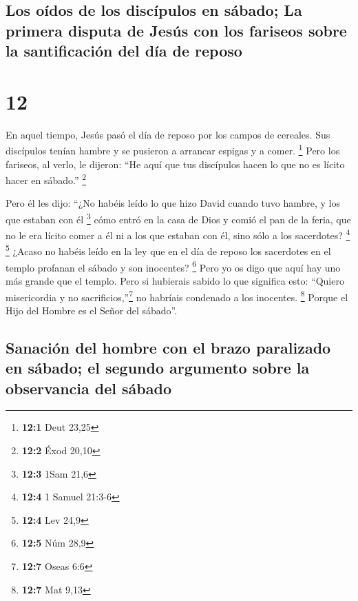 \begin{paracol}{2}
{\subsection{Los oídos de los discípulos en sábado; La primera disputa de
Jesús con los fariseos sobre la santificación del día de
reposo}\label{los-ouxeddos-de-los-discuxedpulos-en-suxe1bado-la-primera-disputa-de-jesuxfas-con-los-fariseos-sobre-la-santificaciuxf3n-del-duxeda-de-reposo}}

\hypertarget{section-22}{%
\section{12}\label{section-22}}

 En aquel tiempo, Jesús pasó el día de reposo por los
campos de cereales. Sus discípulos tenían hambre y se pusieron a
arrancar espigas y a comer. \footnote{\textbf{12:1} Deut 23,25}
 Pero los fariseos, al verlo, le dijeron: ``He aquí que
tus discípulos hacen lo que no es lícito hacer en sábado.'' \footnote{\textbf{12:2}
  Éxod 20,10}

 Pero él les dijo: ``¿No habéis leído lo que hizo David
cuando tuvo hambre, y los que estaban con él \footnote{\textbf{12:3}
  1Sam 21,6}  cómo entró en la casa de Dios y comió el pan
de la feria, que no le era lícito comer a él ni a los que estaban con
él, sino sólo a los sacerdotes? \footnote{\textbf{12:4} 1 Samuel 21:3-6}
\footnote{\textbf{12:4} Lev 24,9}  ¿Acaso no habéis leído
en la ley que en el día de reposo los sacerdotes en el templo profanan
el sábado y son inocentes? \footnote{\textbf{12:5} Núm 28,9}
 Pero yo os digo que aquí hay uno más grande que el
templo.  Pero si hubierais sabido lo que significa esto:
``Quiero misericordia y no sacrificios,''\footnote{\textbf{12:7} Oseas
  6:6} no habríais condenado a los inocentes. \footnote{\textbf{12:7}
  Mat 9,13}  Porque el Hijo del Hombre es el Señor del
sábado''.

\hypertarget{sanaciuxf3n-del-hombre-con-el-brazo-paralizado-en-suxe1bado-el-segundo-argumento-sobre-la-observancia-del-suxe1bado}{%
\subsection{Sanación del hombre con el brazo paralizado en sábado; el
segundo argumento sobre la observancia del
sábado}\label{sanaciuxf3n-del-hombre-con-el-brazo-paralizado-en-suxe1bado-el-segundo-argumento-sobre-la-observancia-del-suxe1bado}}


\end{paracol}
